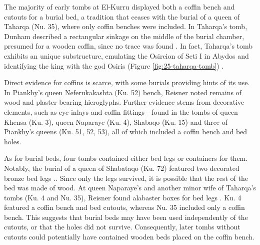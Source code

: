 The majority of early tombs at El-Kurru displayed both a coffin bench and cutouts for a burial bed, a tradition that ceases with the burial of a queen of Taharqa (Nu. 35), where only coffin benches were included. In Taharqa's tomb, Dunham described a rectangular sinkage on the middle of the burial chamber, presumed for a wooden coffin, since no trace was found \parencites[p.~9]{dunhamNuri1955}. In fact, Taharqa's tomb exhibits an unique substructure, emulating the Osireion of Seti I in Abydos and identifying the king with the god Osiris (Figure \ref{fig:25-taharqa-tomb}) \parencites[p.~120]{kendallWhyDidTaharqa2008}[p.~76-77]{lohwasserDoublingDoubleKingdom2019}.


Direct evidence for coffins is scarce, with some burials providing hints of its use. In Piankhy's queen Neferukakashta (Ku. 52) bench, Reisner noted remains of wood and plaster bearing hieroglyphs. Further evidence stems from decorative elements, such as eye inlays and coffin fittings---found in the tombs of queen Khensa (Ku. 3), queen Naparaye (Ku. 4), Shabaqo (Ku. 15) and three of Piankhy's queens (Ku. 51, 52, 53), all of which included a coffin bench and bed holes.


As for burial beds, four tombs contained either bed legs or containers for them. Notably, the burial of a queen of Shabataqo (Ku. 72) featured two decorated bronze bed legs \parencites[p.~104]{dunhamElKurru1950}.. Since only the legs survived, it is possible that the rest of the bed was made of wood. At queen Naparaye's and another minor wife of Taharqa's tombs (Ku. 4 and Nu. 35), Reisner found alabaster boxes for bed legs \parencites[p.~31]{dunhamElKurru1950}[p.~19]{dunhamNuri1955}. Ku. 4 featured a coffin bench and bed cutouts, whereas Nu. 35 included only a coffin bench. This suggests that burial beds may have been used independently of the cutouts, or that the holes did not survive. Consequently, later tombs without cutouts could potentially have contained wooden beds placed on the coffin bench.


